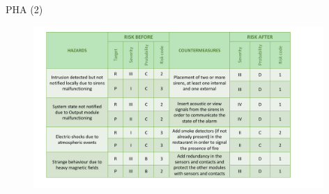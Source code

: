 \begin{frame}{PHA (2)}
  \vskip 0.6cm
    \begin{figure}[ht!]
      \centering
      \includegraphics[width=110mm]{images/pha2.pdf}
      \label{fig:pha2}
    \end{figure}
\end{frame}
